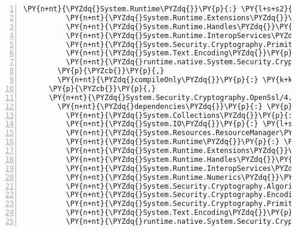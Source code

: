 \begin{Verbatim}[commandchars=\\\{\},numbers=left,firstnumber=1,stepnumber=1,numberblanklines=0]
          \PY{n+nt}{\PYZdq{}System.Runtime\PYZdq{}}\PY{p}{:} \PY{l+s+s2}{\PYZdq{}4.3.0\PYZdq{}}\PY{p}{,}
          \PY{n+nt}{\PYZdq{}System.Runtime.Extensions\PYZdq{}}\PY{p}{:} \PY{l+s+s2}{\PYZdq{}4.3.0\PYZdq{}}\PY{p}{,}
          \PY{n+nt}{\PYZdq{}System.Runtime.Handles\PYZdq{}}\PY{p}{:} \PY{l+s+s2}{\PYZdq{}4.3.0\PYZdq{}}\PY{p}{,}
          \PY{n+nt}{\PYZdq{}System.Runtime.InteropServices\PYZdq{}}\PY{p}{:} \PY{l+s+s2}{\PYZdq{}4.3.0\PYZdq{}}\PY{p}{,}
          \PY{n+nt}{\PYZdq{}System.Security.Cryptography.Primitives\PYZdq{}}\PY{p}{:} \PY{l+s+s2}{\PYZdq{}4.3.0\PYZdq{}}\PY{p}{,}
          \PY{n+nt}{\PYZdq{}System.Text.Encoding\PYZdq{}}\PY{p}{:} \PY{l+s+s2}{\PYZdq{}4.3.0\PYZdq{}}\PY{p}{,}
          \PY{n+nt}{\PYZdq{}runtime.native.System.Security.Cryptography.OpenSsl\PYZdq{}}\PY{p}{:} \PY{l+s+s2}{\PYZdq{}4.3.0\PYZdq{}}
        \PY{p}{\PYZcb{}}\PY{p}{,}
        \PY{n+nt}{\PYZdq{}compileOnly\PYZdq{}}\PY{p}{:} \PY{k+kc}{true}
      \PY{p}{\PYZcb{}}\PY{p}{,}
      \PY{n+nt}{\PYZdq{}System.Security.Cryptography.OpenSsl/4.3.0\PYZdq{}}\PY{p}{:} \PY{p}{\PYZob{}}
        \PY{n+nt}{\PYZdq{}dependencies\PYZdq{}}\PY{p}{:} \PY{p}{\PYZob{}}
          \PY{n+nt}{\PYZdq{}System.Collections\PYZdq{}}\PY{p}{:} \PY{l+s+s2}{\PYZdq{}4.3.0\PYZdq{}}\PY{p}{,}
          \PY{n+nt}{\PYZdq{}System.IO\PYZdq{}}\PY{p}{:} \PY{l+s+s2}{\PYZdq{}4.3.0\PYZdq{}}\PY{p}{,}
          \PY{n+nt}{\PYZdq{}System.Resources.ResourceManager\PYZdq{}}\PY{p}{:} \PY{l+s+s2}{\PYZdq{}4.3.0\PYZdq{}}\PY{p}{,}
          \PY{n+nt}{\PYZdq{}System.Runtime\PYZdq{}}\PY{p}{:} \PY{l+s+s2}{\PYZdq{}4.3.0\PYZdq{}}\PY{p}{,}
          \PY{n+nt}{\PYZdq{}System.Runtime.Extensions\PYZdq{}}\PY{p}{:} \PY{l+s+s2}{\PYZdq{}4.3.0\PYZdq{}}\PY{p}{,}
          \PY{n+nt}{\PYZdq{}System.Runtime.Handles\PYZdq{}}\PY{p}{:} \PY{l+s+s2}{\PYZdq{}4.3.0\PYZdq{}}\PY{p}{,}
          \PY{n+nt}{\PYZdq{}System.Runtime.InteropServices\PYZdq{}}\PY{p}{:} \PY{l+s+s2}{\PYZdq{}4.3.0\PYZdq{}}\PY{p}{,}
          \PY{n+nt}{\PYZdq{}System.Runtime.Numerics\PYZdq{}}\PY{p}{:} \PY{l+s+s2}{\PYZdq{}4.3.0\PYZdq{}}\PY{p}{,}
          \PY{n+nt}{\PYZdq{}System.Security.Cryptography.Algorithms\PYZdq{}}\PY{p}{:} \PY{l+s+s2}{\PYZdq{}4.3.0\PYZdq{}}\PY{p}{,}
          \PY{n+nt}{\PYZdq{}System.Security.Cryptography.Encoding\PYZdq{}}\PY{p}{:} \PY{l+s+s2}{\PYZdq{}4.3.0\PYZdq{}}\PY{p}{,}
          \PY{n+nt}{\PYZdq{}System.Security.Cryptography.Primitives\PYZdq{}}\PY{p}{:} \PY{l+s+s2}{\PYZdq{}4.3.0\PYZdq{}}\PY{p}{,}
          \PY{n+nt}{\PYZdq{}System.Text.Encoding\PYZdq{}}\PY{p}{:} \PY{l+s+s2}{\PYZdq{}4.3.0\PYZdq{}}\PY{p}{,}
          \PY{n+nt}{\PYZdq{}runtime.native.System.Security.Cryptography.OpenSsl\PYZdq{}}\PY{p}{:} \PY{l+s+s2}{\PYZdq{}4.3.0\PYZdq{}}

\end{Verbatim}
